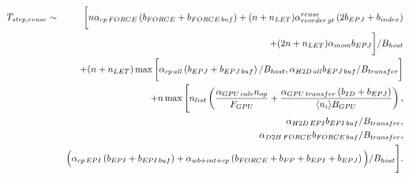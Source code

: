\documentclass[dvipdfmx]{pasj01}
\begin{document}
\begin{eqnarray}
  T_{\rm step, reuse} &\sim&  \bigg[ n \alpha_{\rm cp\, FORCE} \left( b_{\rm FORCE} + b_{\rm FORCE\, buf} \right)
    + (n+n_{\rm LET}) \alpha^{\rm reuse}_{\rm reorder\, gt} \left( 2b_{\rm EPJ} + b_{\rm index} \right) \nonumber \\
    && + (2n+n_{\rm LET}) \alpha_{\rm mom} b_{\rm EPJ} \bigg] / B_{\rm host} \nonumber \\
  && + (n+n_{\rm LET}) \max \bigg[ \alpha_{\rm cp\, all} \left( b_{\rm EPJ} + b_{\rm EPJ\, buf} \right)  / B_{\rm host}, \alpha_{\rm H2D\, all} b_{\rm EPJ\, buf} / B_{\rm transfer} \bigg] \nonumber  \\
  && + n \max \Bigg[ n_{\rm list} \left( \frac{\alpha_{\rm GPU\, calc} n_{\rm op}}{F_{\rm GPU}} + \frac{\alpha_{\rm GPU\, transfer} \left(b_{\rm ID} + b_{\rm EPJ} \right) }{\langle n_i \rangle B_{\rm GPU}} \right), \nonumber \\
    && \alpha_{\rm H2D\, EPI} b_{\rm EPI\, buf} / B_{\rm transfer}, \nonumber  \\
    && \alpha_{\rm D2H\, FORCE} b_{\rm FORCE\, buf} / B_{\rm transfer}, \nonumber \\
    && \Big( \alpha_{\rm cp\, EPI} \left( b_{\rm EPI} + b_{\rm EPI\, buf}\right)
    + \alpha_{\rm wb+int+cp} \left( b_{\rm FORCE} + b_{\rm FP} + b_{\rm EPI} + b_{\rm EPJ} \right)   \Big) / B_{\rm host} \Bigg].  
 \label{eq:total_reuse}
\end{eqnarray}
\end{document}
